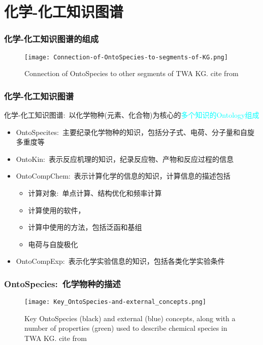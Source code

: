 \section{化学-化工知识图谱}
\frame
{
	\frametitle{化学-化工知识图谱的组成}
\begin{figure}[h!]
\centering
\vskip -8pt
\texttt{[image: Connection-of-OntoSpecies-to-segments-of-KG.png]}
\caption{\tiny\textrm{Connection of OntoSpecies to other segments of TWA KG. cite from\cite{ACR56-128_2023}}}%
\label{Fig:OntoSpecies-to-segments-TWA}
\end{figure}
}

\frame
{
	\frametitle{化学-化工知识图谱}
	化学-化工知识图谱:~以化学物种(元素、化合物)为核心的\textcolor{cyan}{多个知识的\textrm{Ontology}组成}
	\begin{itemize}
		\item \textrm{OntoSpecites}:~主要纪录化学物种的知识，包括分子式、电荷、分子量和自旋多重度等
		\item \textrm{OntoKin}:~表示反应机理的知识，纪录反应物、产物和反应过程的信息
		\item \textrm{OntoCompChem}:~表示计算化学的信息的知识，计算信息的描述包括
			\begin{itemize}
				\item 计算对象:~单点计算、结构优化和频率计算
				\item 计算使用的软件，{\fontsize{7.2pt}{5.2pt}}
				\item 计算中使用的方法，包括泛函和基组{\fontsize{7.2pt}{5.2pt}}
				\item 电荷与自旋极化
			\end{itemize}
		\item \textrm{OntoCompExp}:~表示化学实验信息的知识，包括各类化学实验条件
	\end{itemize}
}

\frame
{
	\frametitle{\textrm{OntoSpecies}:~化学物种的描述}
\begin{figure}[h!]
\centering
\vskip -8pt
\texttt{[image: Key\_OntoSpecies-and-external\_concepts.png]}
\caption{\tiny\textrm{Key OntoSpecies (black) and external (blue) concepts, along with a number of properties (green) used to describe chemical species in TWA KG. cite from\cite{ACR56-128_2023}}}%
\label{Fig:Key-OntoSpecies-and-external-concepts}
\end{figure}
}

